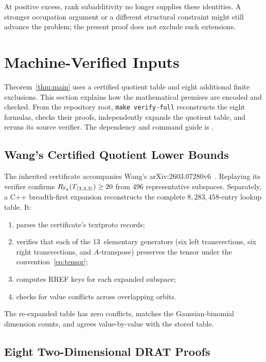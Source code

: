 \documentclass[11pt,a4paper]{article}
\begin{document}
At positive excess, rank subadditivity no longer supplies these identities. A stronger occupation argument or a different structural constraint might still advance the problem; the present proof does not exclude such extensions.


\section{Machine-Verified Inputs}\label{sec:machine}

Theorem~\ref{thm:main} uses a certified quotient table and eight additional
finite exclusions. This section explains how the mathematical premises
are encoded and checked. From the repository root, \texttt{make verify-full}
reconstructs the eight formulas, checks their proofs, independently expands
the quotient table, and reruns its source verifier. The dependency and
command guide is .

\subsection{Wang's Certified Quotient Lower Bounds}

The inherited certificate accompanies Wang's
arXiv:2603.07280v6~\cite{wangautomated}. Replaying its verifier confirms
$R_{\mathbb{F}_2}(T_{\langle3,3,3\rangle})\ge20$ from 496 representative subspaces.
Separately, a C++ breadth-first expansion reconstructs the complete
$8{,}283{,}458$-entry lookup table. It:
\begin{enumerate}
  \item parses the certificate's textproto records;
  \item verifies that each of the 13~elementary generators (six left transvections, six right transvections, and $A$-transpose) preserves the tensor under the convention~\eqref{eq:tensor};
  \item computes RREF keys for each expanded subspace;
  \item checks for value conflicts across overlapping orbits.
\end{enumerate}
The re-expanded table has zero conflicts, matches the Gaussian-binomial
dimension counts, and agrees value-by-value with the stored table.

\subsection{Eight Two-Dimensional DRAT Proofs}
\end{document}
